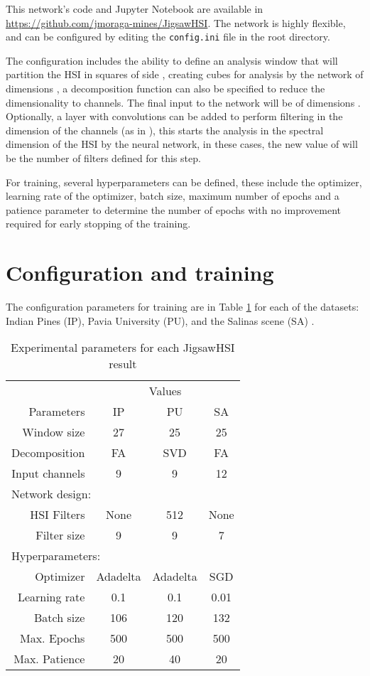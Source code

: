 \documentclass[lettersize, journal]{IEEEtran}
\begin{document}
 This network's code and Jupyter Notebook are available in \url{https://github.com/jmoraga-mines/JigsawHSI}. The network is highly flexible, and can be configured by editing the {\texttt{config.ini}} file in the root directory.  

The configuration includes the ability to define an analysis window that will partition the HSI  in squares of side , creating cubes for analysis by the network of dimensions , a decomposition function can also be specified to reduce the dimensionality to  channels. The final input to the network will be of dimensions . Optionally, a layer with  convolutions can be added to perform filtering in the dimension of the channels (as in \cite{lin_network_2014}), this starts the analysis in the spectral dimension of the HSI by the neural network, in these cases, the new value of  will be the number of filters defined for this step. 

For training, several hyperparameters can be defined, these include the optimizer, learning rate of the optimizer, batch size, maximum number of epochs and a patience parameter to determine the number of epochs with no improvement required for early stopping of the training.

\section{Configuration and training}
The configuration parameters for training are in Table \ref{tab:parameters} for each of the datasets: Indian Pines (IP), Pavia University (PU), and the Salinas scene (SA) .

\begin{table}[htb]
    \centering
    \caption{Experimental parameters for each JigsawHSI result}
    \label{tab:parameters}
    \begin{tabular}{r|c|c|c}
    \toprule
         & \multicolumn{3}{c}{Values}   \\
        Parameters \hfill & IP & PU & SA   \\
        \midrule
        Window size & 27 & 25 & 25   \\
        Decomposition & FA & SVD & FA   \\
        Input channels & 9 & 9 & 12   \\
       \multicolumn{4}{l}{Network design:}  \hfill \\
        HSI Filters & None & 512 & None   \\
        Filter size & 9 & 9 & 7   \\
        \multicolumn{4}{l}{Hyperparameters:} \hfill  \\
        Optimizer & Adadelta & Adadelta & SGD   \\
        Learning rate & 0.1 & 0.1 & 0.01   \\
        Batch size & 106 & 120 & 132   \\
        Max. Epochs & 500 & 500 & 500   \\
        Max. Patience & 20 & 40 & 20   \\
    \bottomrule
    \end{tabular}
\end{table}
\end{document}
